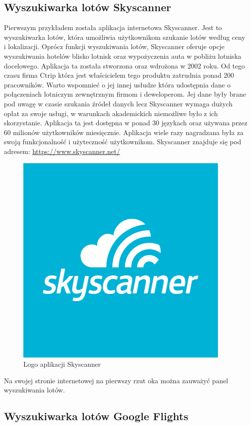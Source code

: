 \documentclass[a4paper, 12pt, twoside]{article}
\begin{document}
\subsection{Wyszukiwarka lotów Skyscanner}
Pierwszym przykładem została aplikacja internetowa Skyscanner. Jest to wyszukiwarka lotów, która umożliwia użytkownikom szukanie lotów według ceny i lokalizacji. Oprócz funkcji wyszukiwania lotów, Skyscanner oferuje opcje wyszukiwania hotelów blisko lotnisk oraz wypożyczenia auta w pobliżu lotniska docelowego. Aplikacja ta została stworzona oraz wdrożona w 2002 roku. Od tego czasu firma Ctrip która jest właścicielem tego produktu zatrudnia ponad 200 pracowników. Warto wspomnieć o jej innej usłudze która udostępnia dane o połączeniach lotniczym zewnętrznym firmom i deweloperom. Jej dane były brane pod uwagę w czasie szukania źródeł danych lecz Skyscanner wymaga dużych opłat za swoje usługi, w warunkach akademickich niemożliwe było z ich skorzystanie.
 Aplikacja ta jest dostępna w ponad 30 językach oraz używana przez 60 milionów użytkowników miesięcznie. Aplikacja wiele razy nagradzana była za swoją funkcjonalność i użyteczność użytkownikom. Skyscanner znajduje się pod adresem: \url{https://www.skyscanner.net/}

\vspace{1.0cm}
\begin{figure}[!ht]
\centering
\includegraphics[scale=0.4, keepaspectratio]{skyscanner.png}
\caption{Logo aplikacji Skyscanner}
\label{fig:skyscanner}
\end{figure}

 
\newpage
Na swojej stronie internetowej na pierwszy rzut oka można zauważyć panel wyszukiwania lotów.


\newpage
\subsection{Wyszukiwarka lotów Google Flights}
\end{document}

